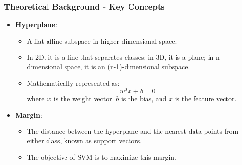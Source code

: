 \documentclass{beamer}
\begin{document}
\begin{frame}[fragile]
    \frametitle{Theoretical Background - Key Concepts}
    \begin{itemize}
        \item \textbf{Hyperplane}:
            \begin{itemize}
                \item A flat affine subspace in higher-dimensional space.
                \item In 2D, it is a line that separates classes; in 3D, it is a plane; in n-dimensional space, it is an (n-1)-dimensional subspace.
                \item Mathematically represented as:
                \begin{equation}
                    w^T x + b = 0
                \end{equation}
                where \( w \) is the weight vector, \( b \) is the bias, and \( x \) is the feature vector.
            \end{itemize}
        
        \item \textbf{Margin}:
            \begin{itemize}
                \item The distance between the hyperplane and the nearest data points from either class, known as support vectors.
                \item The objective of SVM is to maximize this margin.
            \end{itemize}
    \end{itemize}
\end{frame}
\end{document}
